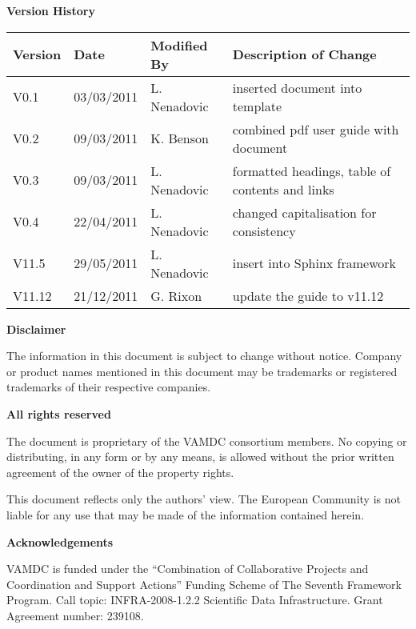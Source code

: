 {\begin{titlepage}
\end{titlepage}

\noindent \textbf{Version History}

\textbf{}

\noindent \begin{tabular}{|l|l|l|l|} 
\hline 
\textbf{Version} & \textbf{Date} & \textbf{Modified By} & \textbf{Description of Change} \\ \hline 
V0.1  & 03/03/2011 & L. Nenadovic  & inserted document into template \\ \hline 
V0.2  & 09/03/2011 & K. Benson & combined pdf user guide with document \\ \hline 
V0.3  & 09/03/2011 & L. Nenadovic & formatted headings, table of contents and links \\ \hline 
V0.4  & 22/04/2011 & L. Nenadovic & changed capitalisation for consistency \\ \hline 
V11.5 & 29/05/2011 & L. Nenadovic  & insert into Sphinx framework \\ \hline 
V11.12 & 21/12/2011 & G. Rixon  & update the guide to v11.12 \\ \hline 
\end{tabular}

\textbf{}

\noindent \textbf{Disclaimer}

\noindent The information in this document is subject to change without notice. Company or product names mentioned in this document may be trademarks or registered trademarks of their respective companies.


\textbf{}

\noindent \textbf{All rights reserved}

\noindent The document is proprietary of the VAMDC consortium members. No copying or distributing, in any form or by any means, is allowed without the prior written agreement of the owner of the property rights.

\noindent 

\noindent This document reflects only the authors' view. The European Community is not liable for any use that may be made of the information contained herein.

\textbf{}

\noindent \textbf{Acknowledgements}

\noindent VAMDC is funded under the ``Combination of Collaborative Projects and Coordination and  Support Actions'' Funding Scheme of The Seventh Framework Program. Call topic: INFRA-2008-1.2.2 Scientific Data Infrastructure. Grant Agreement number: 239108.

\textbf{}

}